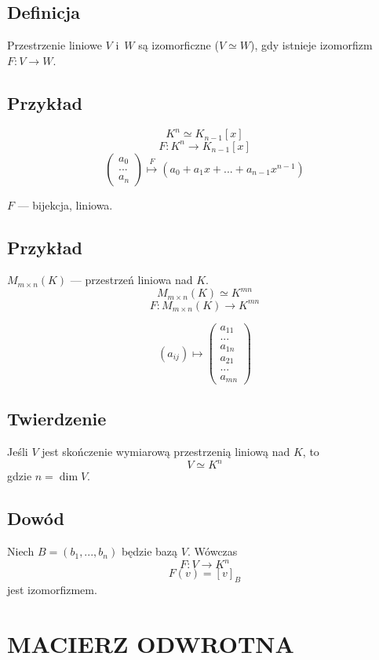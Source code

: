\documentclass{article}
\begin{document}
  \subsection*{Definicja}
  Przestrzenie liniowe $V$ i~$W$ są izomorficzne ($V \simeq W$), gdy istnieje
  izomorfizm $F: V \rightarrow W$.

  \subsection*{Przykład}
  \[K^n \simeq K_{n-1}[x]\]
  \[F: K^n \rightarrow K_{n-1}[x]\]
  \[\begin{pmatrix}a_0\\...\\a_n\end{pmatrix} \overset{F}{\longmapsto}
    \left(a_0+a_1x+...+a_{n-1}x^{n-1}\right)\]

  $F$ --- bijekcja, liniowa.

  \subsection*{Przykład}
  $M_{m\times n}(K)$ --- przestrzeń liniowa nad $K$.
  \[M_{m\times n}(K) \simeq K^{mn}\]
  \[F: M_{m\times n}(K) \rightarrow K^{mn}\]

  \[(a_{ij}) \longmapsto \begin{pmatrix}a_{11}\\...\\a_{1n}\\
    a_{21}\\...\\a_{mn}\end{pmatrix}\]
  
  \subsection*{Twierdzenie}
  Jeśli $V$ jest skończenie wymiarową przestrzenią liniową nad $K$, to
  \[V \simeq K^n\]
  gdzie $n=\dim V$.

  \subsection*{Dowód}
  Niech $B=(b_1, ..., b_n)$ będzie bazą $V$. Wówczas
  \[F: V \rightarrow K^n\]
  \[F(v) = [v]_B\]
  jest izomorfizmem.

  \section*{MACIERZ ODWROTNA}
\end{document}

